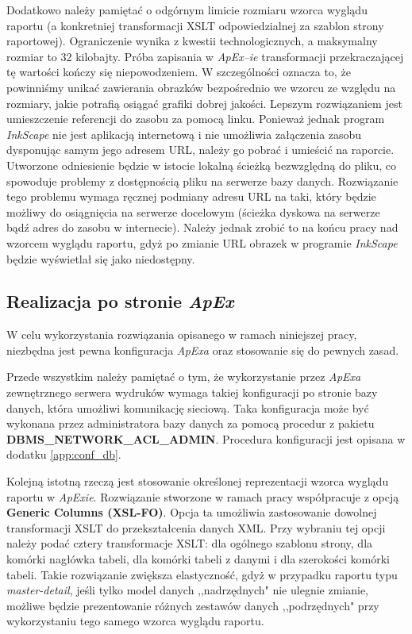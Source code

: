 \documentclass[11pt,a4paper]{article}
\begin{document}
Dodatkowo należy pamiętać o odgórnym limicie rozmiaru wzorca wyglądu raportu (a konkretniej transformacji XSLT odpowiedzialnej za szablon strony raportowej). Ograniczenie wynika z kwestii technologicznych, a maksymalny rozmiar to 32 kilobajty. Próba zapisania w \emph{ApEx--ie} transformacji przekraczającej tę wartości kończy się niepowodzeniem. W szczególności oznacza to, że powinniśmy unikać zawierania obrazków bezpośrednio we wzorcu ze względu na rozmiary, jakie potrafią osiągać grafiki dobrej jakości. Lepszym rozwiązaniem jest umieszczenie referencji do zasobu za pomocą linku. Ponieważ jednak program \emph{InkScape} nie jest aplikacją internetową i nie umożliwia załączenia zasobu dysponując samym jego adresem URL, należy go pobrać i umieścić na raporcie. Utworzone odniesienie będzie w istocie lokalną ścieżką bezwzględną do pliku, co spowoduje problemy z dostępnością pliku na serwerze bazy danych. Rozwiązanie tego problemu wymaga ręcznej podmiany adresu URL na taki, który będzie możliwy do osiągnięcia na serwerze docelowym (ścieżka dyskowa na serwerze bądź adres do zasobu w internecie). Należy jednak zrobić to na końcu pracy nad wzorcem wyglądu raportu, gdyż po zmianie URL obrazek w programie \emph{InkScape} będzie wyświetlał się jako niedostępny.


\subsection{Realizacja po stronie \emph{ApEx}} \label{solution:realization}
W celu wykorzystania rozwiązania opisanego w ramach niniejszej pracy, niezbędna jest pewna konfiguracja \emph{ApExa} oraz stosowanie się do pewnych zasad.

Przede wszystkim należy pamiętać o tym, że wykorzystanie przez \emph{ApExa} zewnętrznego serwera wydruków wymaga takiej konfiguracji po stronie bazy danych, która umożliwi komunikację sieciową. Taka konfiguracja może być wykonana przez administratora bazy danych za pomocą procedur z pakietu \textbf{DBMS\_NETWORK\_ACL\_ADMIN}. Procedura konfiguracji jest opisana w dodatku \ref{app:conf_db}.

Kolejną istotną rzeczą jest stosowanie określonej reprezentacji wzorca wyglądu raportu w \emph{ApExie}. Rozwiązanie stworzone w ramach pracy współpracuje z opcją \textbf{Generic Columns (XSL-FO)}. Opcja ta umożliwia zastosowanie dowolnej transformacji XSLT do przekształcenia danych XML. Przy wybraniu tej opcji należy podać cztery transformacje XSLT: dla ogólnego szablonu strony, dla komórki nagłówka tabeli, dla komórki tabeli z danymi i dla szerokości komórki tabeli.
Takie rozwiązanie zwiększa elastyczność, gdyż w przypadku raportu typu \emph{master-detail}, jeśli tylko model danych ,,nadrzędnych" nie ulegnie zmianie, możliwe będzie prezentowanie różnych zestawów danych ,,podrzędnych" przy wykorzystaniu tego samego wzorca wyglądu raportu. 
\end{document}
